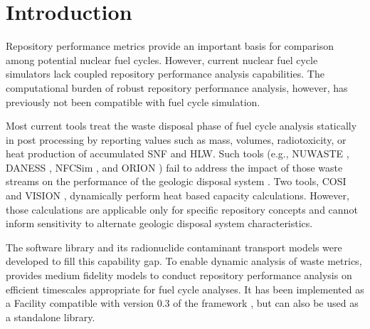 \section{Introduction}\label{sec:introduction}
Repository performance metrics provide an important basis for comparison among 
potential nuclear fuel cycles. However, current nuclear fuel cycle simulators 
lack coupled repository performance analysis capabilities.  The computational 
burden of robust repository performance analysis, however, has previously not been 
compatible with fuel cycle simulation.

Most current tools treat the waste disposal
phase of fuel cycle analysis statically in post processing by reporting
values such as mass, volumes, radiotoxicity, or heat production of accumulated
\gls{SNF} and \gls{HLW}. Such tools
(e.g.,
\gls{NUWASTE} \cite{abkowitz_nuclear_2010},
\gls{DANESS} \cite{van_den_durpel_daness:_2006},
\gls{NFCSim} \cite{schneider_nfcsim_2004}, and
ORION \cite{gregg_orion_2011})
fail to address the impact of those waste streams on the performance of the
geologic disposal system \cite{wilson_comparing_2011}.  Two tools, \gls{COSI}
\cite{boucher_international_2010} and \gls{VISION} \cite{yacout_vision_2006,
wilson_comparing_2011, radel_repository_2007, boucher_international_2010},
dynamically perform heat based capacity calculations.
However, those calculations are applicable only for specific
repository concepts and cannot inform sensitivity to alternate geologic disposal
system characteristics.

The \Cyder software library \cite{huff_cyder_2013} and its radionuclide 
contaminant transport models were  developed to fill this capability gap.  To 
enable dynamic analysis of waste metrics, \Cyder provides medium fidelity 
models to conduct repository performance analysis on efficient timescales 
appropriate for fuel cycle analyses. It has been implemented as a Facility 
compatible with version 0.3 of the \Cyclus framework \cite{wilson:_cyclus_2013}, but can 
also be used as a standalone library.

